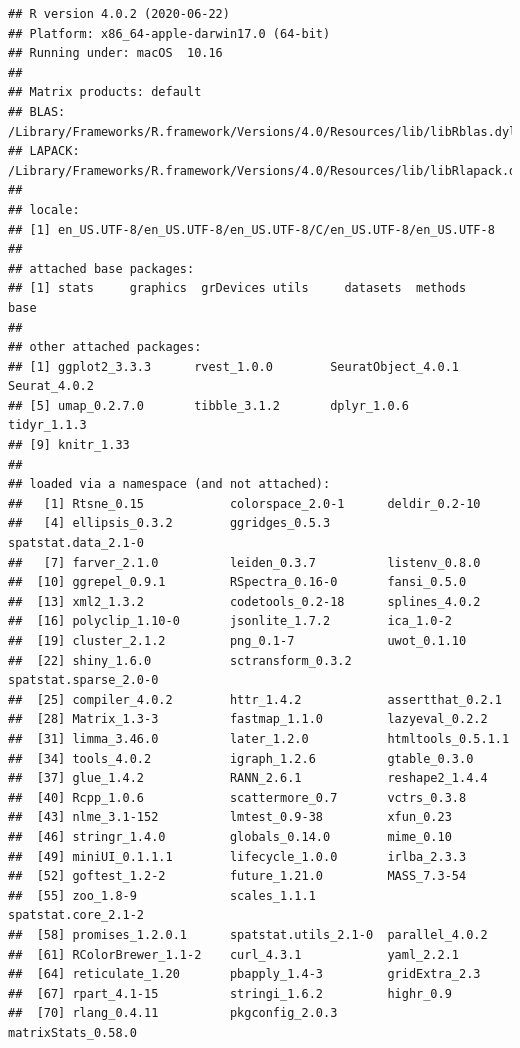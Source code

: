 \documentclass[]{article}
\begin{document}
\begin{verbatim}
## R version 4.0.2 (2020-06-22)
## Platform: x86_64-apple-darwin17.0 (64-bit)
## Running under: macOS  10.16
## 
## Matrix products: default
## BLAS:   /Library/Frameworks/R.framework/Versions/4.0/Resources/lib/libRblas.dylib
## LAPACK: /Library/Frameworks/R.framework/Versions/4.0/Resources/lib/libRlapack.dylib
## 
## locale:
## [1] en_US.UTF-8/en_US.UTF-8/en_US.UTF-8/C/en_US.UTF-8/en_US.UTF-8
## 
## attached base packages:
## [1] stats     graphics  grDevices utils     datasets  methods   base     
## 
## other attached packages:
## [1] ggplot2_3.3.3      rvest_1.0.0        SeuratObject_4.0.1 Seurat_4.0.2      
## [5] umap_0.2.7.0       tibble_3.1.2       dplyr_1.0.6        tidyr_1.1.3       
## [9] knitr_1.33        
## 
## loaded via a namespace (and not attached):
##   [1] Rtsne_0.15            colorspace_2.0-1      deldir_0.2-10        
##   [4] ellipsis_0.3.2        ggridges_0.5.3        spatstat.data_2.1-0  
##   [7] farver_2.1.0          leiden_0.3.7          listenv_0.8.0        
##  [10] ggrepel_0.9.1         RSpectra_0.16-0       fansi_0.5.0          
##  [13] xml2_1.3.2            codetools_0.2-18      splines_4.0.2        
##  [16] polyclip_1.10-0       jsonlite_1.7.2        ica_1.0-2            
##  [19] cluster_2.1.2         png_0.1-7             uwot_0.1.10          
##  [22] shiny_1.6.0           sctransform_0.3.2     spatstat.sparse_2.0-0
##  [25] compiler_4.0.2        httr_1.4.2            assertthat_0.2.1     
##  [28] Matrix_1.3-3          fastmap_1.1.0         lazyeval_0.2.2       
##  [31] limma_3.46.0          later_1.2.0           htmltools_0.5.1.1    
##  [34] tools_4.0.2           igraph_1.2.6          gtable_0.3.0         
##  [37] glue_1.4.2            RANN_2.6.1            reshape2_1.4.4       
##  [40] Rcpp_1.0.6            scattermore_0.7       vctrs_0.3.8          
##  [43] nlme_3.1-152          lmtest_0.9-38         xfun_0.23            
##  [46] stringr_1.4.0         globals_0.14.0        mime_0.10            
##  [49] miniUI_0.1.1.1        lifecycle_1.0.0       irlba_2.3.3          
##  [52] goftest_1.2-2         future_1.21.0         MASS_7.3-54          
##  [55] zoo_1.8-9             scales_1.1.1          spatstat.core_2.1-2  
##  [58] promises_1.2.0.1      spatstat.utils_2.1-0  parallel_4.0.2       
##  [61] RColorBrewer_1.1-2    curl_4.3.1            yaml_2.2.1           
##  [64] reticulate_1.20       pbapply_1.4-3         gridExtra_2.3        
##  [67] rpart_4.1-15          stringi_1.6.2         highr_0.9            
##  [70] rlang_0.4.11          pkgconfig_2.0.3       matrixStats_0.58.0   

\end{verbatim}
\end{document}
